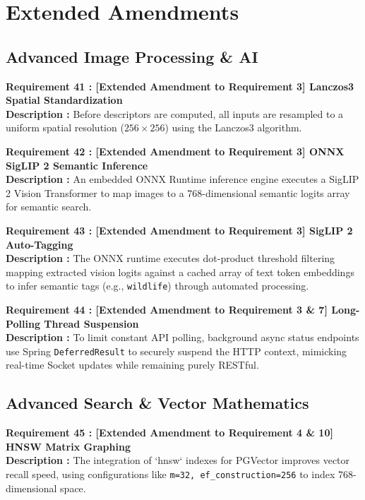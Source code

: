 \documentclass[12pt, a4paper]{article}
\begin{document}
\clearpage

\section{Extended Amendments}

\subsection*{Advanced Image Processing \& AI}

\noindent\textbf{Requirement 41 : [Extended Amendment to Requirement 3] Lanczos3 Spatial Standardization}\\
\textbf{Description :} Before descriptors are computed, all inputs are resampled to a uniform spatial resolution ($256\times256$) using the Lanczos3 algorithm.
\vspace{1em}

\noindent\textbf{Requirement 42 : [Extended Amendment to Requirement 3] ONNX SigLIP 2 Semantic Inference}\\
\textbf{Description :} An embedded ONNX Runtime inference engine executes a SigLIP 2 Vision Transformer to map images to a 768-dimensional semantic logits array for semantic search.
\vspace{1em}

\noindent\textbf{Requirement 43 : [Extended Amendment to Requirement 3] SigLIP 2 Auto-Tagging}\\
\textbf{Description :} The ONNX runtime executes dot-product threshold filtering mapping extracted vision logits against a cached array of text token embeddings to infer semantic tags (e.g., \texttt{wildlife}) through automated processing.
\vspace{1em}

\noindent\textbf{Requirement 44 : [Extended Amendment to Requirement 3 \& 7] Long-Polling Thread Suspension}\\
\textbf{Description :} To limit constant API polling, background async status endpoints use Spring \texttt{DeferredResult} to securely suspend the HTTP context, mimicking real-time Socket updates while remaining purely RESTful.
\vspace{1.5em}

\subsection*{Advanced Search \& Vector Mathematics}

\noindent\textbf{Requirement 45 : [Extended Amendment to Requirement 4 \& 10] HNSW Matrix Graphing}\\
\textbf{Description :} The integration of `hnsw` indexes for PGVector improves vector recall speed, using configurations like \texttt{m=32, ef\_construction=256} to index 768-dimensional space.
\vspace{1em}
\end{document}
